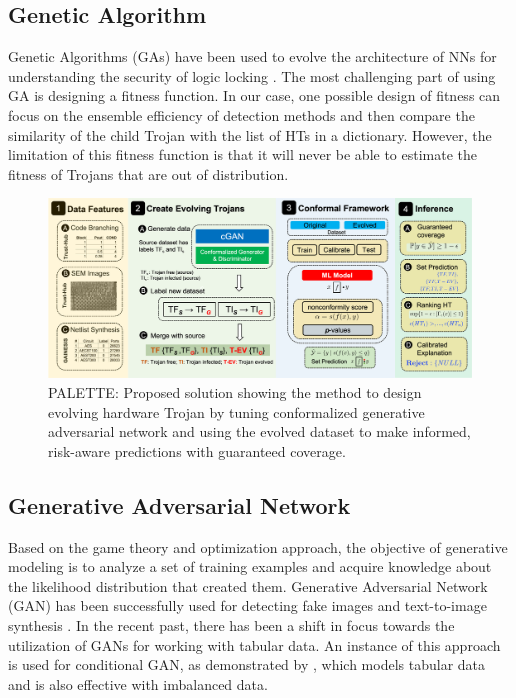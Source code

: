\subsection*{Genetic Algorithm} 
\label{sec:GA}
Genetic Algorithms (GAs) \cite{holland1992genetic} have been used to evolve the architecture of NNs for understanding the security of logic locking \cite{sisejkovic2021challenging}. The most challenging part of using GA is designing a fitness function. In our case, one possible design of fitness can focus on the ensemble efficiency of detection methods and then compare the similarity of the child Trojan with the list of HTs in a dictionary. However, the limitation of this fitness function is that it will never be able to estimate the fitness of Trojans that are out of distribution.

\begin{figure}[ht]
  \centering
   \includegraphics[width=1\linewidth]{figs/Solution.png}
  \caption{PALETTE: Proposed solution showing the method to design evolving hardware Trojan by tuning conformalized generative adversarial network and using the evolved dataset to make informed, risk-aware predictions with guaranteed coverage.}
  \label{fig:solution}
\end{figure}

\subsection*{Generative Adversarial Network} 
\label{sec:GAN}
Based on the game theory and optimization approach, the objective of generative modeling \cite{goodfellow2020generative} is to analyze a set of training examples and acquire knowledge about the likelihood distribution that created them. Generative Adversarial Network (GAN) has been successfully used for detecting fake images \cite{ojha2023towards} and text-to-image synthesis \cite{kang2023scaling}. In the recent past, there has been a shift in focus towards the utilization of GANs for working with tabular data. An instance of this approach is used for conditional GAN, as demonstrated by \cite{xu2019modeling}, which models tabular data and is also effective with imbalanced data. %

